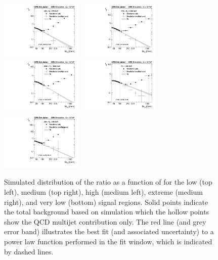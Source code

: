 \begin{figure}
	\centering
	\includegraphics[width=0.35\textwidth]{backgrounds/figs/ratio_HT450to575_j2toInf_b0toInf}
	\includegraphics[width=0.35\textwidth]{backgrounds/figs/ratio_HT575to1000_j2toInf_b0toInf}
	\includegraphics[width=0.35\textwidth]{backgrounds/figs/ratio_HT1000to1500_j2toInf_b0toInf}
	\includegraphics[width=0.35\textwidth]{backgrounds/figs/ratio_HT1500toInf_j2toInf_b0toInf}
	\includegraphics[width=0.35\textwidth]{backgrounds/figs/ratio_HT250to450_j2toInf_b0toInf}
	\caption{Simulated distribution of the \rphi ratio as a function of \mttwo for the low (top left), medium (top right), high (medium left), extreme (medium right), and very low (bottom) \HT signal regions. Solid points indicate the total background based on simulation which the hollow points show the QCD multijet contribution only. The red line (and grey error band) illustrates the best fit (and associated uncertainty) to a power law function performed in the fit window, which is indicated by dashed lines.}
	\label{fig:rphiDependence}
\end{figure}

